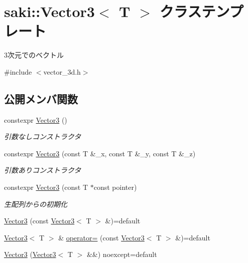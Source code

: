 \hypertarget{classsaki_1_1_vector3}{}\section{saki\+:\+:Vector3$<$ T $>$ クラステンプレート}
\label{classsaki_1_1_vector3}


3次元でのベクトル  




{\ttfamily \#include $<$vector\+\_\+3d.\+h$>$}

\subsection*{公開メンバ関数}
\begin{DoxyCompactItemize}
\item 
constexpr \mbox{\hyperlink{classsaki_1_1_vector3_a8617fe1a8d279c9673628728a0c5e5c6}{Vector3}} ()
\begin{DoxyCompactList}\small\item\em 引数なしコンストラクタ \end{DoxyCompactList}\item 
constexpr \mbox{\hyperlink{classsaki_1_1_vector3_abaf9038ebdc4895d7df1319b6234d790}{Vector3}} (const T \&\+\_\+x, const T \&\+\_\+y, const T \&\+\_\+z)
\begin{DoxyCompactList}\small\item\em 引数ありコンストラクタ \end{DoxyCompactList}\item 
constexpr \mbox{\hyperlink{classsaki_1_1_vector3_a486cbaea59124a022d52b4dcfc4bfdab}{Vector3}} (const T $\ast$const pointer)
\begin{DoxyCompactList}\small\item\em 生配列からの初期化 \end{DoxyCompactList}\item 
\mbox{\hyperlink{classsaki_1_1_vector3_ae996c120efb16029f71c26e24dfaa144}{Vector3}} (const \mbox{\hyperlink{classsaki_1_1_vector3}{Vector3}}$<$ T $>$ \&)=default
\item 
\mbox{\hyperlink{classsaki_1_1_vector3}{Vector3}}$<$ T $>$ \& \mbox{\hyperlink{classsaki_1_1_vector3_ac007820dba4edbbc1ee4cc030bc181a7}{operator=}} (const \mbox{\hyperlink{classsaki_1_1_vector3}{Vector3}}$<$ T $>$ \&)=default
\item 
\mbox{\hyperlink{classsaki_1_1_vector3_add1b3e26d1c54b75f1903c6303eb08a6}{Vector3}} (\mbox{\hyperlink{classsaki_1_1_vector3}{Vector3}}$<$ T $>$ \&\&) noexcept=default

\end{DoxyCompactItemize}
